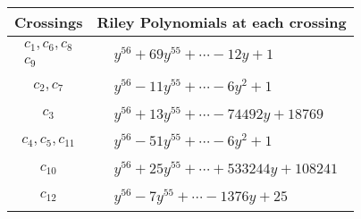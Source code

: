 \documentclass[1p]{elsarticle_modified}
\theoremstyle{definition}
\begin{document}
\begin{tabular}{m{50pt}|m{274pt}}
Crossings & \hspace{64pt}Riley Polynomials at each crossing \\
\hline $$\begin{aligned}c_{1},c_{6},c_{8}\\c_{9}\end{aligned}$$&$\begin{aligned}
&y^{56}+69 y^{55}+\cdots-12 y+1
\end{aligned}$\\
\hline $$\begin{aligned}c_{2},c_{7}\end{aligned}$$&$\begin{aligned}
&y^{56}-11 y^{55}+\cdots-6 y^2+1
\end{aligned}$\\
\hline $$\begin{aligned}c_{3}\end{aligned}$$&$\begin{aligned}
&y^{56}+13 y^{55}+\cdots-74492 y+18769
\end{aligned}$\\
\hline $$\begin{aligned}c_{4},c_{5},c_{11}\end{aligned}$$&$\begin{aligned}
&y^{56}-51 y^{55}+\cdots-6 y^2+1
\end{aligned}$\\
\hline $$\begin{aligned}c_{10}\end{aligned}$$&$\begin{aligned}
&y^{56}+25 y^{55}+\cdots+533244 y+108241
\end{aligned}$\\
\hline $$\begin{aligned}c_{12}\end{aligned}$$&$\begin{aligned}
&y^{56}-7 y^{55}+\cdots-1376 y+25
\end{aligned}$\\
\hline
\end{tabular}
\vskip 2pc
\end{document}
